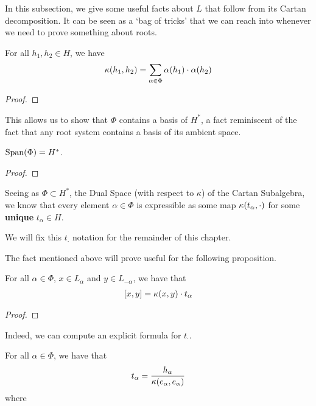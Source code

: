 In this subsection, we give some useful facts about $L$ that follow from its Cartan decomposition. It can be seen as a `bag of tricks' that we can reach into whenever we need to prove something about roots.

\begin{boxlemma}
    For all $h_1, h_2 \in H$, we have
    \begin{align*}
        \kappa\!\left( h_1, h_2 \right) = \sum_{\alpha \in \Phi} \alpha\!\left( h_1 \right) \cdot \alpha\!\left( h_2 \right)
    \end{align*}
\end{boxlemma}
\begin{proof}
    \sorry
\end{proof}

This allows us to show that $\Phi$ contains a basis of $H^*$, a fact reminiscent of the fact that any root system contains a basis of its ambient space.

\begin{boxcorollary}
    $\operatorname{Span}\!\left( \Phi \right) = H^*$.
\end{boxcorollary}
\begin{proof}
    \sorry
\end{proof}

Seeing as $\Phi \subset H^*$, the Dual Space (with respect to $\kappa$) of the Cartan Subalgebra, we know that every element $\alpha \in \Phi$ is expressible as some map $\kappa\!\left( t_{\alpha}, \cdot \right)$ for some \textbf{unique} $t_{\alpha} \in H$.
\begin{boxconvention}
    We will fix this $t_{\cdot}$ notation for the remainder of this chapter.
\end{boxconvention}

The fact mentioned above will prove useful for the following proposition.

\begin{boxproposition}
    For all $\alpha \in \Phi$, $x \in L_{\alpha}$ and $y \in L_{-\alpha}$, we have that
    \begin{align*}
        \left[ x, y \right] = \kappa\!\left( x, y \right) \cdot t_{\alpha}
    \end{align*}
\end{boxproposition}
\begin{proof}
    \sorry
\end{proof}

Indeed, we can compute an explicit formula for $t_{\cdot}$.

\begin{boxproposition}
    For all $\alpha \in \Phi$, we have that
    \begin{align*}
        t_{\alpha} = \frac{h_{\alpha}}{\kappa\!\left( e_{\alpha}, e_{\alpha} \right)}
    \end{align*}
    where
\end{boxproposition}
